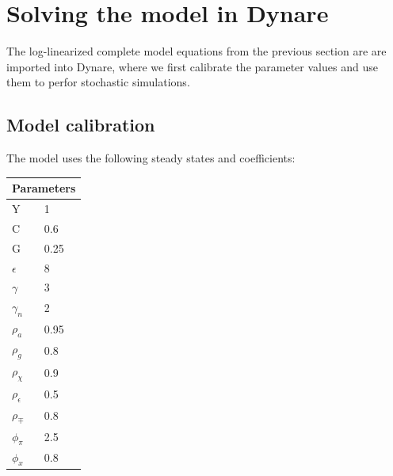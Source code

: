 \documentclass[10pt,a4paper]{article}
\begin{document}
\section{Solving the model in Dynare}
The log-linearized complete model equations from the previous section are are imported into Dynare, where we first calibrate the parameter values and use them to perfor stochastic simulations.
\subsection{Model calibration}
The model uses the following steady states and coefficients:
\\

\begin{center}
 \begin{tabular}{ |p{2cm}||p{1cm}|  }
 \hline
 \multicolumn{2}{|c|}{Parameters} \\
 \hline
 Y   & 1 \\
 C &  0.6 \\
 G & 0.25 \\
 $\epsilon$ & 8 \\
 $\gamma$ & 3 \\
 $\gamma_n$ & 2 \\
 $\rho_a$ &  0.95\\
 $\rho_g$ &  0.8\\
 $\rho_\chi$ &  0.9\\
 $\rho_\epsilon$ &  0.5\\
 $\rho_\mp$ &  0.8\\
 $\phi_\pi$ &  2.5\\
 $\phi_x$ &  0.8\\
 \hline
\end{tabular}
\end{center}
\end{document}
